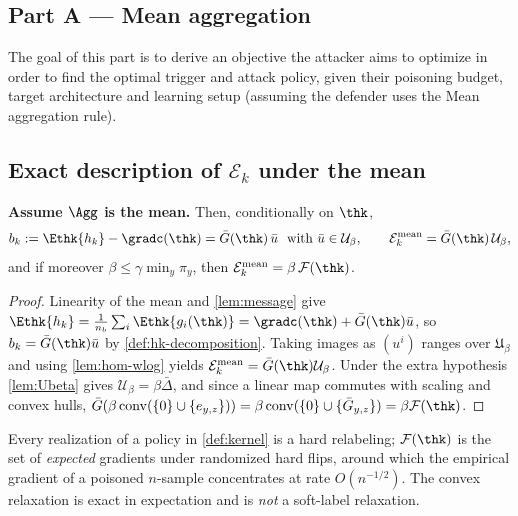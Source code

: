 \subsection*{Part A --- Mean aggregation}

The goal of this part is to derive an objective the attacker aims to optimize in order to find
the optimal trigger and attack policy, given their poisoning budget, target architecture and
learning setup (assuming the defender uses the Mean aggregation rule).

\subsection{Exact description of $\mathcal{E}_k$ under the mean}
\label{sec:Ek-mean}

\begin{proposition}
\label{prop:Ek-mean}
\textbf{Assume $\Agg$ is the mean.} Then, conditionally on $\thk$,
\begin{equation}
b_k:= \Ethk{h_k} - \gradc(\thk) = \bar G(\thk)\,\bar u\ \text{ with }\bar u\in\mathcal{U}_\beta,
\qquad
\mathcal{E}_k^{\mathrm{mean}}=\bar G(\thk)\,\mathcal{U}_\beta ,
\end{equation}
and if moreover $\beta\le\gamma\min_y\pi_y$, then $\mathcal{E}_k^{\mathrm{mean}}=\beta\,\mathcal{F}(\thk)$.
\end{proposition}

\begin{proof}
Linearity of the mean and \cref{lem:message} give $\Ethk{h_k}=\tfrac1{n_b}\sum_i\Ethk{g_i(\thk)}=\gradc(\thk)+\bar G(\thk)\bar u$, so $b_k=\bar G(\thk)\bar u$ by \cref{def:hk-decomposition}. Taking images as $(u^i)$ ranges over $\mathfrak{U}_\beta$ and using \cref{lem:hom-wlog} yields $\mathcal{E}_k^{\mathrm{mean}}=\bar G(\thk)\mathcal{U}_\beta$. Under the extra hypothesis \cref{lem:Ubeta} gives $\mathcal{U}_\beta=\beta\bar\Delta$, and since a linear map commutes with scaling and convex hulls, $\bar G(\beta\,\mathrm{conv}(\{0\}\cup\{e_{y,z}\}))=\beta\,\mathrm{conv}(\{0\}\cup\{\bar G_{y,z}\})=\beta\mathcal{F}(\thk)$.
\end{proof}

\begin{remark}
\label{rem:hard-flips}
Every realization of a policy in \cref{def:kernel} is a hard relabeling; $\mathcal{F}(\thk)$ is the set of \emph{expected} gradients under randomized hard flips, around which the empirical gradient of a poisoned $n$-sample concentrates at rate $O(n^{-1/2})$. The convex relaxation is exact in expectation and is \emph{not} a soft-label relaxation.
\end{remark}

